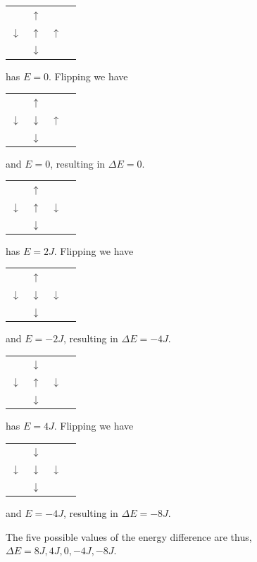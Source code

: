 \documentclass[english,notitlepage,reprint,nofootinbib]{revtex4-1}  %
\begin{document}
\begin{table}[H]
    \begin{tabular}{llll}
                     & $\uparrow$   &            \\
        $\downarrow$ & $\uparrow$   & $\uparrow$ \\
                     & $\downarrow$ &
    \end{tabular}
    has $E = 0$. Flipping we have
    \begin{tabular}{llll}
                     & $\uparrow$   &            \\
        $\downarrow$ & $\downarrow$ & $\uparrow$ \\
                     & $\downarrow$ &
    \end{tabular}
    and $E = 0$, resulting in $\Delta E = 0$.
\end{table}

\begin{table}[H]
    \begin{tabular}{llll}
                     & $\uparrow$   &              \\
        $\downarrow$ & $\uparrow$   & $\downarrow$ \\
                     & $\downarrow$ &
    \end{tabular}
    has $E = 2J$. Flipping we have
    \begin{tabular}{llll}
                     & $\uparrow$   &              \\
        $\downarrow$ & $\downarrow$ & $\downarrow$ \\
                     & $\downarrow$ &
    \end{tabular}
    and $E = -2J$, resulting in $\Delta E = -4J$.
\end{table}

\begin{table}[H]
    \begin{tabular}{llll}
                     & $\downarrow$ &              \\
        $\downarrow$ & $\uparrow$   & $\downarrow$ \\
                     & $\downarrow$ &
    \end{tabular}
    has $E = 4J$. Flipping we have
    \begin{tabular}{llll}
                     & $\downarrow$ &              \\
        $\downarrow$ & $\downarrow$ & $\downarrow$ \\
                     & $\downarrow$ &
    \end{tabular}
    and $E = -4J$, resulting in $\Delta E = -8J$.
\end{table}
The five possible values of the energy difference are thus, $\Delta E = 8J, 4J, 0, -4J, -8J$.
\end{document}
